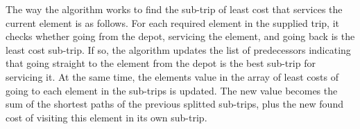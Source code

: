 

The way the algorithm works to find the sub-trip of least cost that services the current element is as follows. For each required element in the supplied trip, it checks whether going from the depot, servicing the element, and going back is the least cost sub-trip. If so, the algorithm updates the list of predecessors indicating that going straight to the element from the depot is the best sub-trip for servicing it. At the same time, the elements value in the array of least costs of going to each element in the sub-trips is updated. The new value becomes the sum of the shortest paths of the previous splitted sub-trips, plus the new found cost of visiting this element in its own sub-trip.

